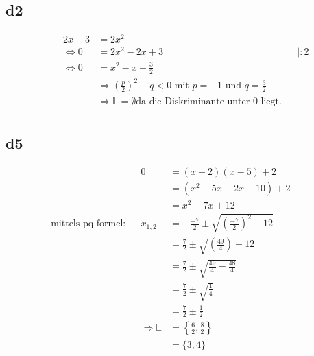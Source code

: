 \documentclass[]{article}
\newcommand{\eq}{\Leftrightarrow}
\newcommand{\rarr}{\Rightarrow}
\begin{document}
\subsection*{d2}
\begin{align*}
	&& 2x-3 &= 2x^2 && \\
	&&\eq 0 &= 2x^2 -2x +3 && |:2\\
	&&\eq 0 &= x^2 -x +\frac{3}{2} &&\\
	&& &\rarr \left(\frac{p}{2}\right)^2 - q < 0 \text{ mit } p=-1 \text{ und } q = \frac{3}{2} &&\\
	&& &\rarr \mathbb{L} = \emptyset  \text{da die Diskriminante unter $0$ liegt.}&&\\
\end{align*}
\subsection*{d5}
\begin{align*}
	&& 0 &= (x-2)(x-5)+2 && \\
	&& &= (x^2-5x-2x+10)+2 && \\
	&& &= x^2-7x+12 && \\
	\text{mittels pq-formel:}&& x_{1,2} &= -\frac{-7}{2} \pm \sqrt{\left(\frac{-7}{2}\right)^2 - 12} &&\\
	&& &= \frac{7}{2} \pm \sqrt{\left(\frac{49}{4}\right) - 12} &&\\
	&& &= \frac{7}{2} \pm \sqrt{\frac{49}{4} - \frac{48}{4}} &&\\
	&& &= \frac{7}{2} \pm \sqrt{\frac{1}{4}} &&\\
	&& &= \frac{7}{2} \pm \frac{1}{2} &&\\
	&& \rarr \mathbb{L} &= \left\{\frac{6}{2}, \frac{8}{2}\right\} &&\\
	&& &= \{3, 4\} &&\\
\end{align*}
\end{document}
